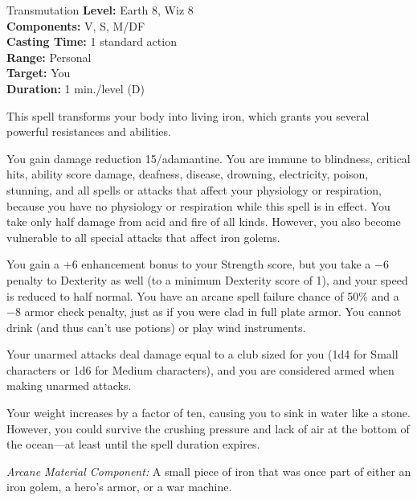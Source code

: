 {Transmutation}
{
	\textbf{Level:}
	Earth 8, Wiz 8\\
	\textbf{Components:}
	V, S, M/DF\\
	\textbf{Casting Time:}
	1 standard action\\
	\textbf{Range:}
	Personal\\
	\textbf{Target:}
	You\\
	\textbf{Duration:}
	1 min./level (D)\\
}
{
	This spell transforms your body into living iron, which grants you several powerful resistances and abilities.

	You gain damage reduction 15/adamantine. You are immune to blindness, critical hits, ability score damage, deafness, disease, drowning, electricity, poison, stunning, and all spells or attacks that affect your physiology or respiration, because you have no physiology or respiration while this spell is in effect. You take only half damage from acid and fire of all kinds. However, you also become vulnerable to all special attacks that affect iron golems.

	You gain a +6 enhancement bonus to your Strength score, but you take a $-6$ penalty to Dexterity as well (to a minimum Dexterity score of 1), and your speed is reduced to half normal. You have an arcane spell failure chance of 50\% and a $-8$ armor check penalty, just as if you were clad in full plate armor. You cannot drink (and thus can't use potions) or play wind instruments.

	Your unarmed attacks deal damage equal to a club sized for you (1d4 for Small characters or 1d6 for Medium characters), and you are considered armed when making unarmed attacks.

	Your weight increases by a factor of ten, causing you to sink in water like a stone. However, you could survive the crushing pressure and lack of air at the bottom of the ocean---at least until the spell duration expires.

	\textit{Arcane Material Component:}
	A small piece of iron that was once part of either an iron golem, a hero's armor, or a war machine.

}
